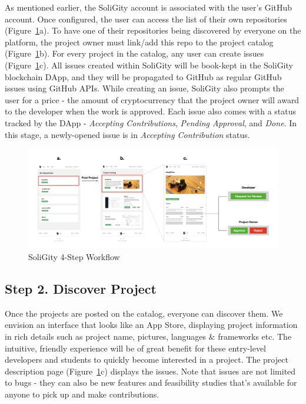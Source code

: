 \documentclass[12pt]{article}
\renewcommand{\_}{\kern-1.5pt\textunderscore\kern-1.5pt}
\begin{document}
As mentioned earlier, the SoliGity account is associated with the user’s GitHub account. Once configured, the user can access the list of their own repositories (Figure~\ref{fig:workflow2}a). To have one of their repositories being discovered by everyone on the platform, the project owner must link/add this repo to the project catalog (Figure~\ref{fig:workflow2}b). For every project in the catalog, any user can create issues (Figure~\ref{fig:workflow2}c). All issues created within SoliGity will be book-kept in the SoliGity blockchain DApp, and they will be propagated to GitHub as regular GitHub issues using GitHub APIs. While creating an issue, SoliGity also prompts the user for a price - the amount of cryptocurrency that the project owner will award to the developer when the work is approved. Each issue also comes with a status tracked by the DApp - \textit{Accepting Contributions}, \textit{Pending Approval}, and \textit{Done}. In this stage, a newly-opened issue is in \textit{Accepting Contribution} status.


\begin{figure}[h]
	\centering
	\includegraphics[width=16.5cm]{graphs/00b. workflow.jpeg}
	\caption{SoliGity 4-Step Workflow}
	\label{fig:workflow2}
\end{figure}

\subsection*{Step 2. Discover Project}

Once the projects are posted on the catalog, everyone can discover them. We envision an interface that looks like an App Store, displaying project information in rich details such as project name, pictures, languages \& frameworks etc. The intuitive, friendly experience will be of great benefit for these entry-level developers and students to quickly become interested in a project. The project description page (Figure~\ref{fig:workflow2}c) displays the issues. Note that issues are not limited to bugs - they can also be new features and feasibility studies that’s available for anyone to pick up and make contributions.
\end{document}
